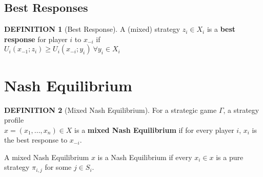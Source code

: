 \documentclass[12pt]{article}
\theoremstyle{definition}
\newtheorem*{definition}{DEFINITION}
\begin{document}
    \subsection*{Best Responses}
        \begin{definition}[Best Response]
            A (mixed) strategy $z_i \in X_i$ is a \textbf{best response} for player $i$ to $x_{-i}$ if \\$U_i(x_{-1};z_i) \geq U_i(x_{-i};y_i) \ \forall y_i \in X_i$
        \end{definition}

\section{Nash Equilibrium}
    \begin{definition}[Mixed Nash Equilibrium]
        For a strategic game $\Gamma$, a strategy profile \\$x = (x_1,...,x_n) \in X$ is a \textbf{mixed Nash Equilibrium} if for every player $i$, $x_i$ is the best response to $x_{-i}$.
    \end{definition}
    A mixed Nash Equilibrium $x$ is a Nash Equilibrium if every $x_i \in x$ is a pure strategy $\pi_{i,j}$ for some $j \in S_i$.
    
\end{document}
